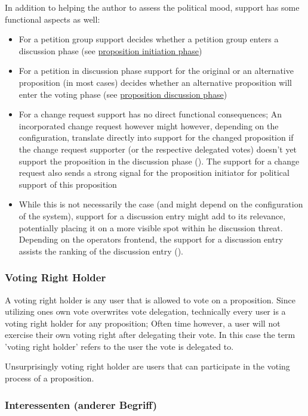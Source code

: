 In addition to helping the author to assess the political mood, support has some functional aspects as well:
\begin{itemize}
\item For a petition group support decides whether a petition group enters a discussion phase (see \hyperref[ssec:Lifecycle_Initiation]{proposition initiation phase})
\item For a petition in discussion phase support for the original or an alternative proposition (in most cases) decides whether an alternative proposition will enter the voting phase (see \hyperref[ssec:Lifecycle_Discussion]{proposition discussion phase})
\item For a change request support has no direct functional consequences; An incorporated change request however might however, depending on the configuration, translate directly into support for the changed proposition if the change request supporter (or the respective delegated votes) doesn't yet support the proposition in the discussion phase (). The support for a change request also sends a strong signal for the proposition initiator for political support of this proposition
\item While this is not necessarily the case (and might depend on the configuration of the system), support for a discussion entry might add to its relevance, potentially placing it on a more visible spot within he discussion threat. Depending on the operators frontend, the support for a discussion entry assists the ranking of the discussion entry ().
\end{itemize}


\subsubsection{Voting Right Holder}
\label{ssec:Roles_VotingRightHolder}
A voting right holder is any user that is allowed to vote on a proposition. Since utilizing ones own vote overwrites vote delegation, technically every user is a voting right holder for any proposition; Often time however, a user will not exercise their own voting right after delegating their vote. In this case the term 'voting right holder' refers to the user the vote is delegated to. 

Unsurprisingly voting right holder are users that can participate in the voting process of a proposition.


\subsubsection{Interessenten (anderer Begriff)}
% 
% 
% 
\label{ssec:Roles_Interessenten}

